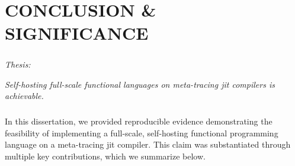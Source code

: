 \chapter[\texorpdfstring{CONCLUSION \& SIGNIFICANCE}
                          {8. Conclusion}]{CONCLUSION \& SIGNIFICANCE}

    \label{chapter:conclusion}












    \paragraph{} \textit{Thesis:}

    \textit{Self-hosting full-scale functional languages on meta-tracing \gls{jit} compilers is achievable.}

    \paragraph{}%
        In this dissertation, we provided reproducible evidence demonstrating the feasibility of implementing a full-scale, self-hosting functional programming language on a meta-tracing \gls{jit} compiler. This claim was substantiated through multiple key contributions, which we summarize below.

